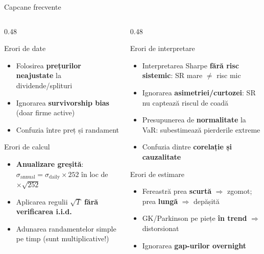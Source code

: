 \documentclass[9pt, aspectratio=169, t]{beamer}
\theoremstyle{definition}
\begin{document}
\begin{frame}[shrink=3]{Capcane frecvente}
\begin{columns}[T]
\begin{column}{0.48\textwidth}
\begin{alertblock}{Erori de date}
\begin{itemize}\setlength{\itemsep}{1pt}
    \item Folosirea \textbf{prețurilor neajustate} la dividende/splituri
    \item Ignorarea \textbf{survivorship bias} (doar firme active)
    \item Confuzia între preț și randament
\end{itemize}
\end{alertblock}
\vspace{0.05cm}
\begin{alertblock}{Erori de calcul}
\begin{itemize}\setlength{\itemsep}{1pt}
    \item \textbf{Anualizare greșită}: $\sigma_{\text{annual}} = \sigma_{\text{daily}} \times 252$ în loc de $\times\sqrt{252}$
    \item Aplicarea regulii $\sqrt{T}$ \textbf{fără verificarea i.i.d.}
    \item Adunarea randamentelor simple pe timp (sunt multiplicative!)
\end{itemize}
\end{alertblock}
\end{column}
\begin{column}{0.48\textwidth}
\begin{alertblock}{Erori de interpretare}
\begin{itemize}\setlength{\itemsep}{1pt}
    \item Interpretarea Sharpe \textbf{fără risc sistemic}: SR mare $\neq$ risc mic
    \item Ignorarea \textbf{asimetriei/curtozei}: SR nu captează riscul de coadă
    \item Presupunerea de \textbf{normalitate} la VaR: subestimează pierderile extreme
    \item Confuzia dintre \textbf{corelație și cauzalitate}
\end{itemize}
\end{alertblock}
\vspace{0.05cm}
\begin{alertblock}{Erori de estimare}
\begin{itemize}\setlength{\itemsep}{1pt}
    \item Fereastră prea \textbf{scurtă} $\Rightarrow$ zgomot; prea \textbf{lungă} $\Rightarrow$ depășită
    \item GK/Parkinson pe piețe \textbf{în trend} $\Rightarrow$ distorsionat
    \item Ignorarea \textbf{gap-urilor overnight}
\end{itemize}
\end{alertblock}
\end{column}
\end{columns}
\end{frame}
\end{document}
